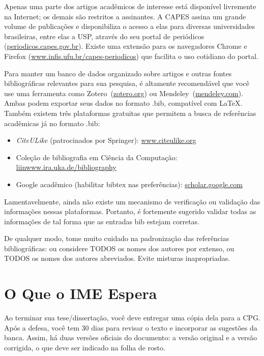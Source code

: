 Apenas uma parte dos artigos acadêmicos de interesse está disponível livremente
na Internet; os demais são restritos a assinantes. A CAPES assina um grande
volume de publicações e disponibiliza o acesso a elas para diversas universidades
brasileiras, entre elas a USP, através do seu portal de periódicos
(\url{periodicos.capes.gov.br}). Existe uma extensão para os navegadores
Chrome e Firefox (\url{www.infis.ufu.br/capes-periodicos}) que facilita o uso
cotidiano do portal.

Para manter um banco de dados organizado sobre artigos e outras fontes bibliográficas
relevantes para sua pesquisa, é altamente recomendável que você use uma ferramenta
como Zotero~(\url{zotero.org}) ou
Mendeley~(\url{mendeley.com}). Ambas podem exportar seus dados no
formato .bib, compatível com \LaTeX{}. Também existem três plataformas
gratuitas que permitem a busca de referências acadêmicas já no formato .bib:

\begin{itemize}
  \item \emph{CiteULike} (patrocinados por Springer): \url{www.citeulike.org}
  \item Coleção de bibliografia em Ciência da Computação: \url{liinwww.ira.uka.de/bibliography}
  \item Google acadêmico (habilitar bibtex nas preferências): \url{scholar.google.com}
\end{itemize}

Lamentavelmente, ainda não existe um mecanismo de verificação ou validação das
informações nessas plataformas. Portanto, é fortemente sugerido validar todas
as informações de tal forma que as entradas bib estejam corretas.

De qualquer modo, tome muito cuidado na padronização das referências
bibliográficas: ou considere TODOS os nomes dos autores por extenso, ou TODOS
os nomes dos autores abreviados.  Evite misturas inapropriadas.

\section{O Que o IME Espera}

Ao terminar sua tese/dissertação, você deve entregar uma cópia dela para a
CPG. Após a defesa, você tem 30 dias para revisar o texto e incorporar as
sugestões da banca. Assim, há duas versões oficiais do documento: a versão
original e a versão corrigida, o que deve ser indicado na folha de rosto.

